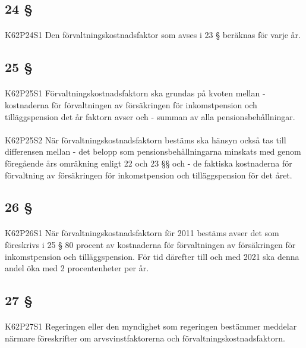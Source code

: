 \documentclass[a4paper,notitlepage,openany,10pt]{book}
\begin{document}
\subsection*{24 §}
\paragraph*{}
{\tiny K62P24S1}
Den förvaltningskostnadsfaktor som avses i 23 § beräknas för varje år.
\subsection*{25 §}
\paragraph*{}
{\tiny K62P25S1}
Förvaltningskostnadsfaktorn ska grundas på kvoten mellan
\newline - kostnaderna för förvaltningen av försäkringen för inkomstpension och tilläggspension det år faktorn avser och
\newline - summan av alla pensionsbehållningar.
\paragraph*{}
{\tiny K62P25S2}
När förvaltningskostnadsfaktorn bestäms ska hänsyn också tas till differensen mellan
\newline - det belopp som pensionsbehållningarna minskats med genom föregående års omräkning enligt 22 och 23 §§ och
\newline - de faktiska kostnaderna för förvaltning av försäkringen för inkomstpension och tilläggspension för det året.
\subsection*{26 §}
\paragraph*{}
{\tiny K62P26S1}
När förvaltningskostnadsfaktorn för 2011 bestäms avser det som föreskrivs i 25 § 80 procent av kostnaderna för förvaltningen av försäkringen för inkomstpension och tilläggspension. För tid därefter till och med 2021 ska denna andel öka med 2 procentenheter per år.
\subsection*{27 §}
\paragraph*{}
{\tiny K62P27S1}
Regeringen eller den myndighet som regeringen bestämmer meddelar närmare föreskrifter om arvsvinstfaktorerna och förvaltningskostnadsfaktorn.
\end{document}
